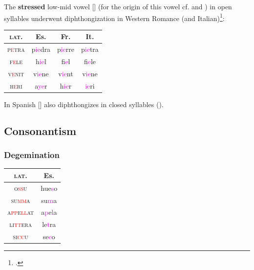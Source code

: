 \documentclass{report}[12pt]
\begin{document}
The \textbf{stressed} low-mid vowel [] (for the origin of this vowel cf.  and ) in open syllables underwent diphthongization in Western Romance (and Italian)\footcite[p.~15-16]{romance_his}:
\begin{center}
\begin{tabular}{c c c c}
  \textsc{lat.} & Es. & Fr. & It. \\
  \hline
  \textsc{p\textcolor{red}{e}tra} & p\textcolor{magenta}{ie}dra & p\textcolor{magenta}{ie}rre & p\textcolor{magenta}{ie}tra \\
  \textsc{f\textcolor{red}{e}le} & h\textcolor{magenta}{ie}l & f\textcolor{magenta}{ie}l & f\textcolor{magenta}{ie}le \\
  \textsc{v\textcolor{red}{e}nit} & v\textcolor{magenta}{ie}ne & v\textcolor{magenta}{ie}nt & v\textcolor{magenta}{ie}ne \\
  \textsc{h\textcolor{red}{e}ri} & a\textcolor{magenta}{ye}r & h\textcolor{magenta}{ie}r & \textcolor{magenta}{ie}ri \\
\end{tabular}
\end{center}
In Spanish [] also diphthongizes in closed syllables ().

\subsection{Consonantism}

\subsubsection*{Degemination}

\begin{tcolorbox}
  
\end{tcolorbox}

\begin{tabular}{c c}
  \textsc{lat.} & Es. \\
  \hline
  \textsc{o\textcolor{red}{ss}u} & hue\textcolor{magenta}{s}o \\
  \textsc{su\textcolor{red}{mm}a} & su\textcolor{magenta}{m}a \\
  \textsc{a\textcolor{red}{pp}e\textcolor{red}{ll}at} & a\textcolor{magenta}{p}e\textcolor{magenta}{l}a \\
  \textsc{li\textcolor{red}{tt}era} & le\textcolor{magenta}{t}ra \\
  \textsc{si\textcolor{red}{cc}u} & se\textcolor{magenta}{c}o \\
\end{tabular}
\end{document}
